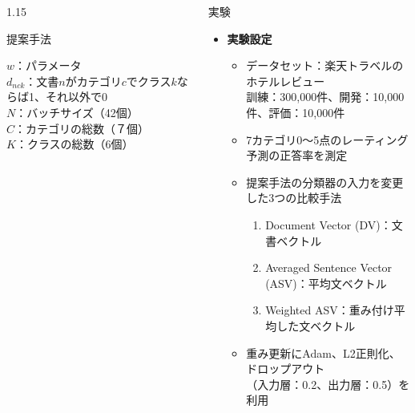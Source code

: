 \documentclass[unicode,10pt]{beamer}
\newlength{\mycolumnwidth}
\newcommand{\itemtitle}[1]{\textbf{#1}\\}
\begin{document}
\begin{frame}[t]
\begin{columns}[onlytextwidth,t]
\begin{column}{1.15\mycolumnwidth}
\begin{block}{提案手法}
\begin{itemize}
{          $w$：パラメータ \\
          $d_{nck}$：文書$n$がカテゴリ$c$でクラス$k$ならば1、それ以外で0 \\
          $N$：バッチサイズ（42個）\\
          $C$：カテゴリの総数（７個）\\
          $K$：クラスの総数（6個）\\
        }
    \end{itemize}
  \end{block}
\end{column}

\begin{column}{\mycolumnwidth}
  \begin{block}{実験}
    \begin{itemize}
      \item \itemtitle{実験設定}
        \begin{itemize}
          \item データセット：楽天トラベルのホテルレビュー\\
                訓練：300,000件、開発：10,000件、評価：10,000件
          \item 7カテゴリ0〜5点のレーティング予測の正答率を測定
          \item 提案手法の分類器の入力を変更した3つの比較手法
            \begin{enumerate}
              \item Document Vector (DV)：文書ベクトル
              \item Averaged Sentence Vector (ASV)：平均文ベクトル
              \item Weighted ASV：重み付け平均した文ベクトル
            \end{enumerate}
          \item 重み更新にAdam、L2正則化、ドロップアウト \\
                （入力層：0.2、出力層：0.5）を利用
        \end{itemize}
    \end{itemize}


\end{block}
\end{column}
\end{columns}
\end{frame}
\end{document}
